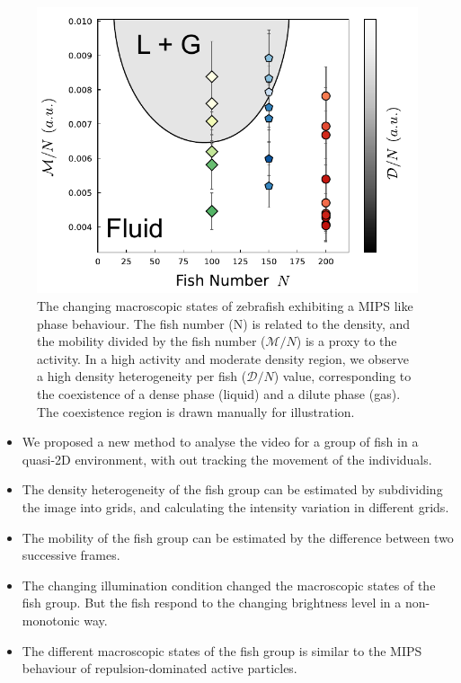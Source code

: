 \documentclass[11pt,twoside]{report}
\begin{document}
\begin{figure}
  \includegraphics[width=\linewidth]{phase}
  \caption[MIPS like phase behaviour of zebrafish]{
  The changing macroscopic states of zebrafish exhibiting a MIPS like phase behaviour. The fish number (\gls{N}) is related to the density, and the mobility divided by the fish number ($\mathcal{M}/N$) is a proxy to the activity. In a high activity and moderate density region, we observe a high density heterogeneity per fish ($\mathcal{D}/N$) value, corresponding to the coexistence of a dense phase (liquid) and a dilute phase (gas). The coexistence region is drawn manually for illustration.
  }
  \label{fig:phase-mips}
\end{figure}

\vfill

\begin{adjustwidth}{0cm}{-5cm}
\begin{tcolorbox}[
fonttitle=\sffamily\Large,
right=0.1\linewidth,
top=5mm,
bottom=5mm,
title=Summary of Appendix A,
]

\begin{itemize}
	\item We proposed a new method to analyse the video for a group of fish in a quasi-2D environment, with out tracking the movement of the individuals.
	\item The density heterogeneity of the fish group can be estimated by subdividing the image into grids, and calculating the intensity variation in different grids.
	\item The mobility of the fish group can be estimated by the difference between two successive frames.
	\item The changing illumination condition changed the macroscopic states of the fish group. But the fish respond to the changing brightness level in a non-monotonic way.
	\item The different macroscopic states of the fish group is similar to the MIPS behaviour of repulsion-dominated active particles.
\end{itemize}
\end{tcolorbox}

\end{adjustwidth}
\end{document}
